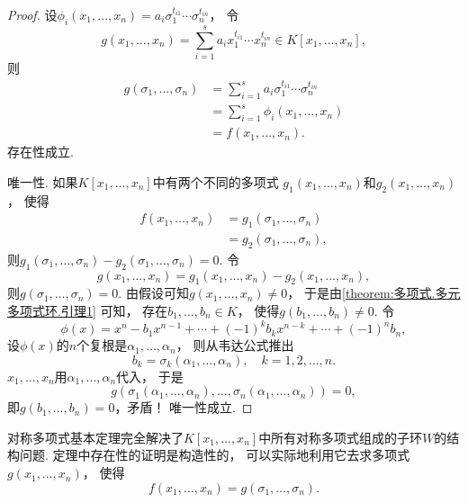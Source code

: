 \begin{theorem}[对称多项式基本定理]
\begin{proof}
设\(\phi_i(x_1,\dotsc,x_n)
=a_i \sigma_1^{t_{i1}} \dotsm \sigma_n^{t_{in}}\)，
令\[
	g(x_1,\dotsc,x_n)
	=\sum_{i=1}^s a_i x_1^{t_{i1}} \dotsm x_n^{t_{in}}
	\in K[x_1,\dotsc,x_n],
\]
则\begin{align*}
	g(\sigma_1,\dotsc,\sigma_n)
	&=\sum_{i=1}^s a_i \sigma_1^{t_{i1}} \dotsm \sigma_n^{t_{in}} \\
	&=\sum_{i=1}^s \phi_i(x_1,\dotsc,x_n) \\
	&=f(x_1,\dotsc,x_n).
\end{align*}
存在性成立.

唯一性.
如果\(K[x_1,\dotsc,x_n]\)中有两个不同的多项式
\(g_1(x_1,\dotsc,x_n)\)和\(g_2(x_1,\dotsc,x_n)\)，
使得\begin{align*}
	f(x_1,\dotsc,x_n)
	&=g_1(\sigma_1,\dotsc,\sigma_n) \\
	&=g_2(\sigma_1,\dotsc,\sigma_n),
\end{align*}
则\(g_1(\sigma_1,\dotsc,\sigma_n)-g_2(\sigma_1,\dotsc,\sigma_n)=0\).
令\[
	g(x_1,\dotsc,x_n)
	=g_1(x_1,\dotsc,x_n)-g_2(x_1,\dotsc,x_n),
\]
则\(g(\sigma_1,\dotsc,\sigma_n)=0\).
由假设可知\(g(x_1,\dotsc,x_n)\neq0\)，
于是由\cref{theorem:多项式.多元多项式环.引理1} 可知，
存在\(b_1,\dotsc,b_n \in K\)，
使得\(g(b_1,\dotsc,b_n)\neq0\).
令\[
	\phi(x)=x^n-b_1x^{n-1}+\dotsb+(-1)^kb_kx^{n-k}+\dotsb+(-1)^nb_n,
\]
设\(\phi(x)\)的\(n\)个复根是\(\alpha_1,\dotsc,\alpha_n\)，
则从韦达公式推出\[
	b_k=\sigma_k(\alpha_1,\dotsc,\alpha_n),
	\quad
	k=1,2,\dotsc,n.
\]
\(x_1,\dotsc,x_n\)用\(\alpha_1,\dotsc,\alpha_n\)代入，
于是\[
	g(\sigma_1(\alpha_1,\dotsc,\alpha_n),\dotsc,\sigma_n(\alpha_1,\dotsc,\alpha_n))=0,
\]
即\(g(b_1,\dotsc,b_n)=0\)，矛盾！
唯一性成立.
\end{proof}
\end{theorem}

对称多项式基本定理完全解决了\(K[x_1,\dotsc,x_n]\)中所有对称多项式组成的子环\(W\)的结构问题.
定理中存在性的证明是构造性的，
可以实际地利用它去求多项式\(g(x_1,\dotsc,x_n)\)，
使得\[
	f(x_1,\dotsc,x_n)
	=g(\sigma_1,\dotsc,\sigma_n).
\]
